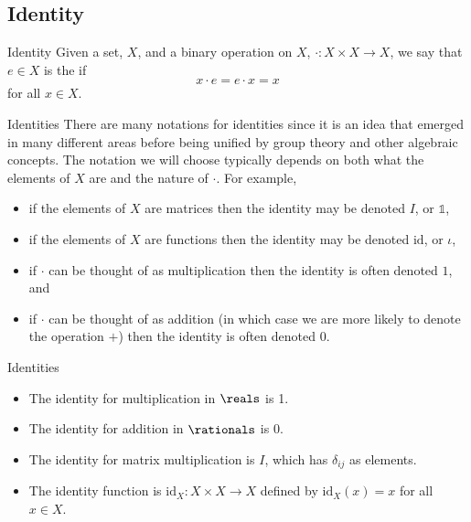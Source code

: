 \documentclass[fleqn]{NotesClass}
\begin{document}
    \subsection{Identity}
    \begin{dfn}{Identity}{}
        Given a set, \(X\), and a binary operation on \(X\), \(\cdot \colon X \times X \to X\), we say that \(e \in X\) is the  if
        \begin{equation}
            x \cdot e = e \cdot x = x
        \end{equation}
        for all \(x \in X\).
    \end{dfn}
    
    \begin{ntn}{Identities}{}
        There are many notations for identities since it is an idea that emerged in many different areas before being unified by group theory and other algebraic concepts.
        The notation we will choose typically depends on both what the elements of \(X\) are and the nature of \(\cdot\).
        For example,
        \begin{itemize}
            \item if the elements of \(X\) are matrices then the identity may be denoted \(I\), or \(\mathbb{1}\),
            \item if the elements of \(X\) are functions then the identity may be denoted \(\mathrm{id}\), or \(\iota\),
            \item if \(\cdot\) can be thought of as multiplication then the identity is often denoted \(1\), and
            \item if \(\cdot\) can be thought of as addition (in which case we are more likely to denote the operation \(+\)) then the identity is often denoted \(0\).
        \end{itemize}
    \end{ntn}
    
    \begin{exm}{Identities}{}
        \begin{itemize}
            \item The identity for multiplication in \(\reals\) is 1.
            \item The identity for addition in \(\rationals\) is 0.
            \item The identity for matrix multiplication is \(I\), which has \(\delta_{ij}\) as elements.
            \item The identity function is \(\mathrm{id}_X \colon X \times X \to X\) defined by \(\mathrm{id}_X(x) = x\) for all \(x \in X\).
        \end{itemize}
    \end{exm}
    
\end{document}
